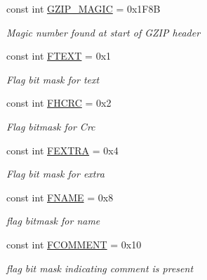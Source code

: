 \begin{DoxyCompactItemize}
\item 
const int \hyperlink{class_i_c_sharp_code_1_1_sharp_zip_lib_1_1_g_zip_1_1_g_zip_constants_a1643cc3b256ffabb5daaeef676308808}{G\+Z\+I\+P\+\_\+\+M\+A\+G\+IC} = 0x1\+F8B
\begin{DoxyCompactList}\small\item\em Magic number found at start of G\+Z\+IP header \end{DoxyCompactList}\item 
const int \hyperlink{class_i_c_sharp_code_1_1_sharp_zip_lib_1_1_g_zip_1_1_g_zip_constants_ad334ef14afaa9d13ed1958029a214480}{F\+T\+E\+XT} = 0x1
\begin{DoxyCompactList}\small\item\em Flag bit mask for text \end{DoxyCompactList}\item 
const int \hyperlink{class_i_c_sharp_code_1_1_sharp_zip_lib_1_1_g_zip_1_1_g_zip_constants_a7ae9e832389038716016d707eddce43e}{F\+H\+C\+RC} = 0x2
\begin{DoxyCompactList}\small\item\em Flag bitmask for Crc \end{DoxyCompactList}\item 
const int \hyperlink{class_i_c_sharp_code_1_1_sharp_zip_lib_1_1_g_zip_1_1_g_zip_constants_a77b93eaa5b76c673b532bbe41364cccd}{F\+E\+X\+T\+RA} = 0x4
\begin{DoxyCompactList}\small\item\em Flag bit mask for extra \end{DoxyCompactList}\item 
const int \hyperlink{class_i_c_sharp_code_1_1_sharp_zip_lib_1_1_g_zip_1_1_g_zip_constants_a1ef4c408280f9e5fb542ada16b2ca73f}{F\+N\+A\+ME} = 0x8
\begin{DoxyCompactList}\small\item\em flag bitmask for name \end{DoxyCompactList}\item 
const int \hyperlink{class_i_c_sharp_code_1_1_sharp_zip_lib_1_1_g_zip_1_1_g_zip_constants_a27214732adc7a4d81413e5581319304b}{F\+C\+O\+M\+M\+E\+NT} = 0x10
\begin{DoxyCompactList}\small\item\em flag bit mask indicating comment is present \end{DoxyCompactList}\end{DoxyCompactItemize}


